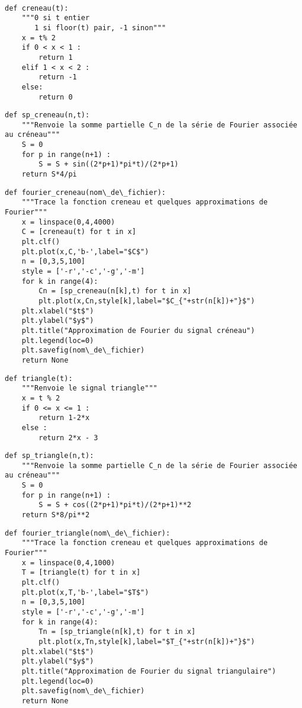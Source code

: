 \exer{[PLT-005]}
\setcounter{numques}{0}~\\

\question{}
\begin{lstlisting}
def creneau(t):
    """0 si t entier
       1 si floor(t) pair, -1 sinon"""
    x = t% 2
    if 0 < x < 1 : 
        return 1
    elif 1 < x < 2 : 
        return -1
    else:
        return 0
\end{lstlisting}
\question{}
\begin{lstlisting}
def sp_creneau(n,t):
    """Renvoie la somme partielle C_n de la série de Fourier associée au créneau"""
    S = 0
    for p in range(n+1) : 
        S = S + sin((2*p+1)*pi*t)/(2*p+1)
    return S*4/pi
\end{lstlisting}
\question{}
\begin{lstlisting}
def fourier_creneau(nom\_de\_fichier):
    """Trace la fonction creneau et quelques approximations de Fourier"""
    x = linspace(0,4,4000)
    C = [creneau(t) for t in x]
    plt.clf()
    plt.plot(x,C,'b-',label="$C$")
    n = [0,3,5,100]
    style = ['-r','-c','-g','-m']
    for k in range(4):
        Cn = [sp_creneau(n[k],t) for t in x]
        plt.plot(x,Cn,style[k],label="$C_{"+str(n[k])+"}$")
    plt.xlabel("$t$")
    plt.ylabel("$y$")
    plt.title("Approximation de Fourier du signal créneau")
    plt.legend(loc=0)
    plt.savefig(nom\_de\_fichier)
    return None
\end{lstlisting}
\question{}
\begin{lstlisting}
def triangle(t):
    """Renvoie le signal triangle"""
    x = t % 2
    if 0 <= x <= 1 :
        return 1-2*x
    else : 
        return 2*x - 3 
\end{lstlisting}
\question{}
\begin{lstlisting}
def sp_triangle(n,t):
    """Renvoie la somme partielle C_n de la série de Fourier associée au créneau"""
    S = 0
    for p in range(n+1) : 
        S = S + cos((2*p+1)*pi*t)/(2*p+1)**2
    return S*8/pi**2 
\end{lstlisting}
\question{}
\begin{lstlisting}
def fourier_triangle(nom\_de\_fichier):
    """Trace la fonction creneau et quelques approximations de Fourier"""
    x = linspace(0,4,1000)
    T = [triangle(t) for t in x]
    plt.clf()
    plt.plot(x,T,'b-',label="$T$")
    n = [0,3,5,100]
    style = ['-r','-c','-g','-m']
    for k in range(4):
        Tn = [sp_triangle(n[k],t) for t in x]
        plt.plot(x,Tn,style[k],label="$T_{"+str(n[k])+"}$")
    plt.xlabel("$t$")
    plt.ylabel("$y$")
    plt.title("Approximation de Fourier du signal triangulaire")
    plt.legend(loc=0)
    plt.savefig(nom\_de\_fichier)
    return None
\end{lstlisting}
